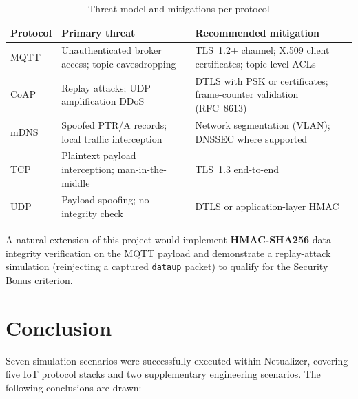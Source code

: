 \documentclass[12pt,a4paper]{article}
\begin{document}
\begin{table}[H]
\centering
\caption{Threat model and mitigations per protocol}
\label{tab:security}
\renewcommand{\arraystretch}{1.3}
\begin{tabular}{p{1.4cm} p{3.5cm} p{5.5cm}}
\toprule
\textbf{Protocol} & \textbf{Primary threat} & \textbf{Recommended mitigation} \\
\midrule
MQTT  & Unauthenticated broker access; topic eavesdropping & TLS~1.2+ channel; X.509 client certificates; topic-level ACLs \\
CoAP  & Replay attacks; UDP amplification DDoS & DTLS with PSK or certificates; frame-counter validation (RFC~8613) \\
mDNS  & Spoofed PTR/A records; local traffic interception & Network segmentation (VLAN); DNSSEC where supported \\
TCP   & Plaintext payload interception; man-in-the-middle & TLS~1.3 end-to-end \\
UDP   & Payload spoofing; no integrity check & DTLS or application-layer HMAC \\
\bottomrule
\end{tabular}
\end{table}

A natural extension of this project would implement \textbf{HMAC-SHA256} data
integrity verification on the MQTT payload and demonstrate a replay-attack
simulation (reinjecting a captured \texttt{dataup} packet) to qualify for the
Security Bonus criterion.

\section{Conclusion}
\label{sec:conclusion}

Seven simulation scenarios were successfully executed within Netualizer,
covering five IoT protocol stacks and two supplementary engineering scenarios.
The following conclusions are drawn:
\end{document}
